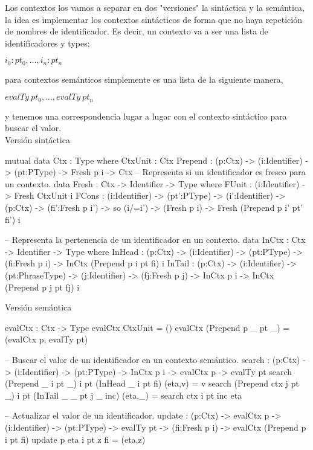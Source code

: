 Los contextos los vamos a separar en dos "versiones" la sint\'actica
y la semántica, la idea es implementar los contextos sint\'acticos de
forma que no haya repetición de nombres de identificador. Es decir,
un contexto va a ser una lista de identificadores y types;

\begin{center}
$i_0 : pt_0, \ldots , i_n:pt_n$
\end{center}

para contextos semánticos simplemente es una lista de la siguiente manera,

\begin{center}
$evalTy \ pt_0, \ldots , evalTy \ pt_n$
\end{center}

y tenemos una correspondencia lugar a lugar con el contexto sintáctico para
buscar el valor.\\

\noindent Versi\'on sint\'actica
\begin{code}
mutual
    data Ctx : Type where
        CtxUnit : Ctx
        Prepend : (p:Ctx) -> (i:Identifier) -> (pt:PType) -> 
                  Fresh p i -> Ctx
    -- Representa si un identificador es fresco para un contexto.
    data Fresh : Ctx -> Identifier -> Type where
        FUnit : (i:Identifier) -> Fresh CtxUnit i
        FCons : (i:Identifier) -> (pt':PType) -> (i':Identifier) -> 
                (p:Ctx) -> (fi':Fresh p i') -> so (i/=i') -> (Fresh p i) -> 
                Fresh (Prepend p i' pt' fi') i
\end{code}

\newpage

\begin{code}
-- Representa la pertenencia de un identificador en un contexto.
data InCtx : Ctx -> Identifier -> Type where
    InHead : (p:Ctx) -> (i:Identifier) -> (pt:PType) -> 
             (fi:Fresh p i) -> InCtx (Prepend p i pt fi) i
    InTail : (p:Ctx) -> (i:Identifier) -> (pt:PhraseType) -> 
             (j:Identifier) -> (fj:Fresh p j) -> 
             InCtx p i -> InCtx (Prepend p j pt fj) i
\end{code}

\noindent Versi\'on sem\'antica
\begin{code}
evalCtx : Ctx -> Type
evalCtx CtxUnit = ()
evalCtx (Prepend p _ pt _) = (evalCtx p, evalTy pt)

-- Buscar el valor de un identificador en un contexto semántico.
search : (p:Ctx) -> (i:Identifier) -> (pt:PType) ->
         InCtx p i -> evalCtx p -> evalTy pt
search (Prepend _ i pt _) i pt (InHead _ i pt fi) (eta,v) = v
search (Prepend ctx j pt _) i pt (InTail _ _ pt j _ inc) (eta,_) = search ctx i pt inc eta

-- Actualizar el valor de un identificador.
update : (p:Ctx) -> evalCtx p -> (i:Identifier) -> 
         (pt:PType) -> evalTy pt -> (fi:Fresh p i) -> evalCtx (Prepend p i pt fi)
update p eta i pt z fi = (eta,z)
\end{code}


